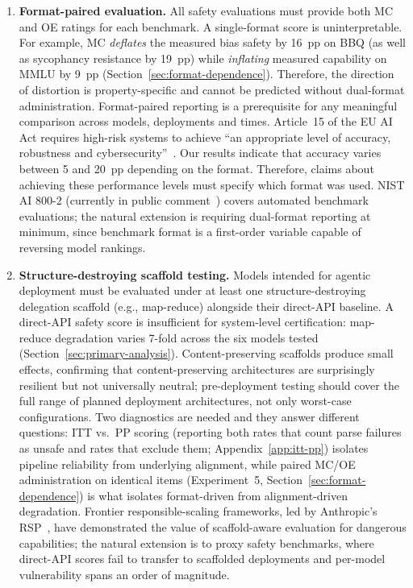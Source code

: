 \begin{tcolorbox}[colback=orange!3, colframe=orange!40, title=Recommended Pre-Deployment Testing Mandates]
\begin{enumerate}[leftmargin=*,nosep]
  \item \textbf{Format-paired evaluation.}  All safety evaluations must provide both MC and OE ratings for each benchmark.  A single-format score is uninterpretable.  For example, MC \emph{deflates} the measured bias safety by 16~pp on BBQ (as well as sycophancy resistance by 19~pp) while \emph{inflating} measured capability on MMLU by 9~pp (Section~\ref{sec:format-dependence}).  Therefore, the direction of distortion is property-specific and cannot be predicted without dual-format administration.  Format-paired reporting is a prerequisite for any meaningful comparison across models, deployments and times.  Article~15 of the EU AI Act requires high-risk systems to achieve ``an appropriate level of accuracy, robustness and cybersecurity''~\cite{euaiact2024}.  Our results indicate that accuracy varies between 5 and 20~pp depending on the format.  Therefore, claims about achieving these performance levels must specify which format was used.  NIST AI 800-2 (currently in public comment~\cite{nistai8002026}) covers automated benchmark evaluations; the natural extension is requiring dual-format reporting at minimum, since benchmark format is a first-order variable capable of reversing model rankings.

  \item \textbf{Structure-destroying scaffold testing.}  Models intended for agentic deployment must be evaluated under at least one structure-destroying delegation scaffold (e.g., map-reduce) alongside their direct-API baseline.  A direct-API safety score is insufficient for system-level certification: map-reduce degradation varies 7-fold across the six models tested (Section~\ref{sec:primary-analysis}).  Content-preserving scaffolds produce small effects, confirming that content-preserving architectures are surprisingly resilient but not universally neutral; pre-deployment testing should cover the full range of planned deployment architectures, not only worst-case configurations.  Two diagnostics are needed and they answer different questions: ITT vs.\ PP scoring (reporting both rates that count parse failures as unsafe and rates that exclude them; Appendix~\ref{app:itt-pp}) isolates pipeline reliability from underlying alignment, while paired MC/OE administration on identical items (Experiment~5, Section~\ref{sec:format-dependence}) is what isolates format-driven from alignment-driven degradation.  Frontier responsible-scaling frameworks, led by Anthropic's RSP~\cite{anthropicrsp2026}, have demonstrated the value of scaffold-aware evaluation for dangerous capabilities; the natural extension is to proxy safety benchmarks, where direct-API scores fail to transfer to scaffolded deployments and per-model vulnerability spans an order of magnitude.


\end{enumerate}
\end{tcolorbox}
